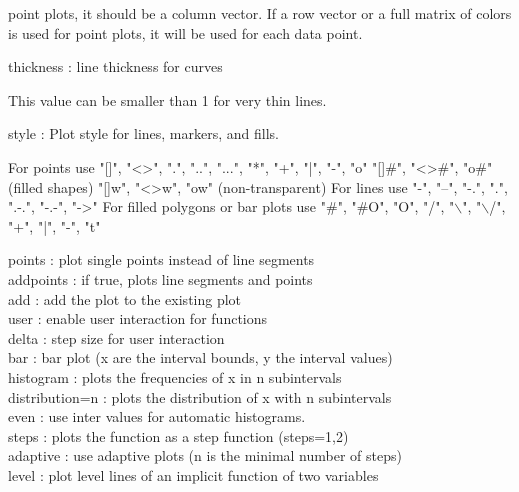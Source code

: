 \documentclass{article}
\begin{document}
\begin{eulernotebook}
\begin{eulercomment}
\begin{eulercomment}
\begin{eulercomment}
\begin{eulercomment}
\begin{eulercomment}
\begin{eulercomment}
\begin{eulercomment}
\begin{eulercomment}
\begin{eulerttcomment}
            point plots, it should be a column vector. If a row vector or a
            full matrix of colors is used for point plots, it will be used for
            each data point.
\end{eulerttcomment}
\begin{eulercomment}
thickness : line thickness for curves\\
\end{eulercomment}
\begin{eulerttcomment}
            This value can be smaller than 1 for very thin lines.
\end{eulerttcomment}
\begin{eulercomment}
style     : Plot style for lines, markers, and fills.\\
\end{eulercomment}
\begin{eulerttcomment}
            For points use
            "[]", "<>", ".", "..", "...",
            "*", "+", "|", "-", "o"
            "[]#", "<>#", "o#" (filled shapes)
            "[]w", "<>w", "ow" (non-transparent)
            For lines use
            "-", "--", "-.", ".", ".-.", "-.-", "->"
            For filled polygons or bar plots use
            "#", "#O", "O", "/", "\(\backslash\)", "\(\backslash\)/",
            "+", "|", "-", "t"
\end{eulerttcomment}
\begin{eulercomment}
points    : plot single points instead of line segments\\
addpoints : if true, plots line segments and points\\
add       : add the plot to the existing plot\\
user      : enable user interaction for functions\\
delta     : step size for user interaction\\
bar       : bar plot (x are the interval bounds, y the interval values)\\
histogram : plots the frequencies of x in n subintervals\\
distribution=n : plots the distribution of x with n subintervals\\
even      : use inter values for automatic histograms.\\
steps     : plots the function as a step function (steps=1,2)\\
adaptive  : use adaptive plots (n is the minimal number of steps)\\
level     : plot level lines of an implicit function of two variables\\

\end{eulercomment}
\end{eulercomment}
\end{eulercomment}
\end{eulercomment}
\end{eulercomment}
\end{eulercomment}
\end{eulercomment}
\end{eulercomment}
\end{eulercomment}
\end{eulernotebook}
\end{document}
